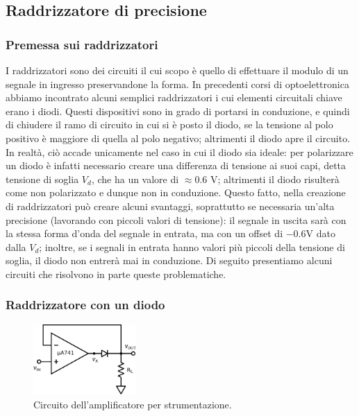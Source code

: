\subsection{Raddrizzatore di precisione}

\subsubsection{Premessa sui raddrizzatori}

I raddrizzatori sono dei circuiti il cui scopo è quello di effettuare il modulo di un segnale in ingresso preservandone la forma. In precedenti corsi di optoelettronica abbiamo incontrato alcuni semplici raddrizzatori i cui elementi circuitali chiave erano i diodi. Questi dispositivi sono in grado di portarsi in conduzione, e quindi di chiudere il ramo di circuito in cui si è posto il diodo, se la tensione al polo positivo è maggiore di quella al polo negativo; altrimenti il diodo apre il circuito. In realtà, ciò accade unicamente nel caso in cui il diodo sia ideale: per polarizzare un diodo è infatti necessario creare una differenza di tensione ai suoi capi, detta tensione di soglia $V_d$, che ha un valore di $\approx 0.6$ \si{\volt}; altrimenti il diodo risulterà come non polarizzato e dunque non in conduzione. Questo fatto, nella creazione di raddrizzatori può creare alcuni svantaggi, soprattutto se necessaria un'alta precisione (lavorando con piccoli valori di tensione): il segnale in uscita sarà con la stessa forma d'onda del segnale in entrata, ma con un offset di $-0.6$\si{\volt} dato dalla $V_d$; inoltre, se i segnali in entrata hanno valori più piccoli della tensione di soglia, il diodo non entrerà mai in conduzione. Di seguito presentiamo alcuni circuiti che risolvono in parte queste problematiche.

\subsubsection{Raddrizzatore con un diodo}

\begin{figure}
  \begin{center}
    \includegraphics[width=0.350\textwidth]{../E05/latex/c_rectifier_A.pdf}
  \end{center}
  \caption{Circuito dell'amplificatore per strumentazione.}
  \label{cir5:raddrizz_1}
\end{figure}

